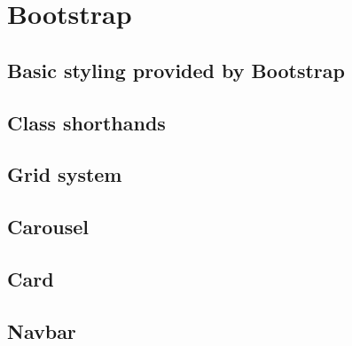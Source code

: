 \chapter{Bootstrap}

\section{Basic styling provided by Bootstrap}

\section{Class shorthands}

\section{Grid system}

\section{Carousel}

\section{Card}

\section{Navbar}
